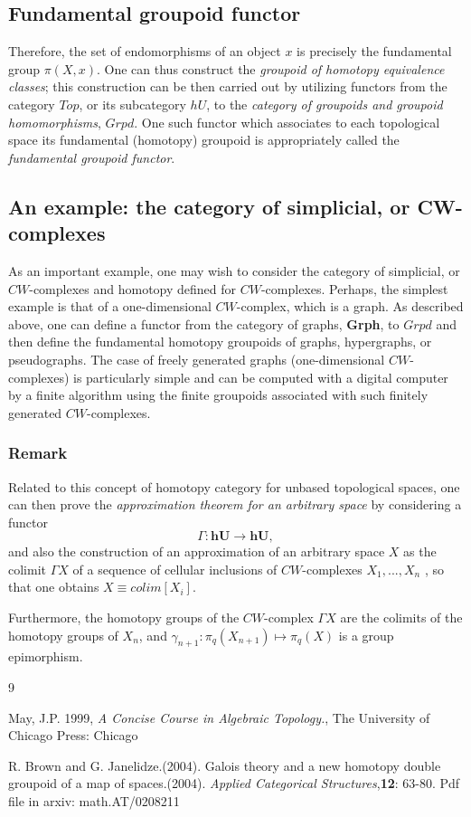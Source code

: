 \documentclass[12pt]{article}
\theoremstyle{plain}
\theoremstyle{definition}
\numberwithin{equation}{section}
\begin{document}
\subsection{Fundamental groupoid functor}

  Therefore, the set of endomorphisms of an object $x$ is precisely the fundamental group
$\pi(X,x)$. One can thus construct the \emph{groupoid of homotopy equivalence classes}; this construction can be then carried out by utilizing functors from the category \textbf{$Top$}, or its subcategory $hU$,
to the \emph{category of groupoids and groupoid homomorphisms}, $Grpd$. One such functor 
which associates to each topological space its fundamental (homotopy) groupoid is appropriately called the
\emph{fundamental groupoid functor}.

\subsection{An example: the category of simplicial, or CW-complexes}
 
  As an important example, one may wish to consider the category of simplicial, or $CW$-complexes and homotopy defined
for $CW$-complexes. Perhaps, the simplest example is that of a one-dimensional $CW$-complex, which is a graph.
As described above, one can define a functor from the category of graphs, \textbf{Grph}, to \textbf{$Grpd$}
and then define the fundamental homotopy groupoids of graphs, hypergraphs, or pseudographs. The case of freely generated
graphs (one-dimensional $CW$-complexes) is particularly simple and can be computed with a digital computer by a finite
algorithm using the finite groupoids associated with such finitely generated $CW$-complexes.

\subsubsection{Remark}
 Related to this concept of homotopy category for unbased topological spaces, one can then prove the 
\emph{approximation theorem for an arbitrary space} by considering a functor 
$$\Gamma : \textbf{hU} \longrightarrow \textbf{hU},$$ and also the construction of an approximation of an arbitrary space $X$ as the 
colimit $\Gamma X$ of a sequence of cellular inclusions of $CW$-complexes $X_1, ..., X_n$ , so 
that one obtains $X \equiv colim  [X_i]$. 

  Furthermore, the homotopy groups of the $CW$-complex $\Gamma X$ are the colimits of the 
homotopy groups of $X_n$,  and $\gamma_{n+1} : \pi_q(X_{n+1})\longmapsto\pi_q (X)$ is a group epimorphism.

\begin{thebibliography} {9}

May, J.P. 1999, \emph{A Concise Course in Algebraic Topology.}, The University of Chicago Press: Chicago


R. Brown and G. Janelidze.(2004). Galois theory and a new homotopy double groupoid of a map of spaces.(2004). 
{\em Applied Categorical Structures},\textbf{12}: 63-80. Pdf file in arxiv: math.AT/0208211 


\end{thebibliography}
\end{document}
